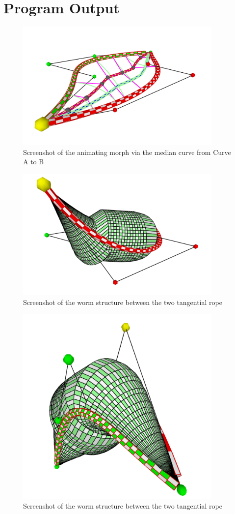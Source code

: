 \documentclass[twoside,11pt]{article}
\begin{document}
 
 
\section{Program Output}

\begin{figure} [H]
    \centering
    \includegraphics[width=04in]{ssAnim.png}
    \caption{Screenshot of the animating morph via the median curve from Curve A to B}
\end{figure}



\begin{figure} [H]
    \centering
    \includegraphics[width=04in]{wormFull.png}
    \caption{Screenshot of the worm structure between the two tangential rope}
\end{figure}

\begin{figure} [H]
    \centering
    \includegraphics[width=04in]{wormFull2.png}
    \caption{Screenshot of the worm structure between the two tangential rope}
\end{figure}
\end{document}
